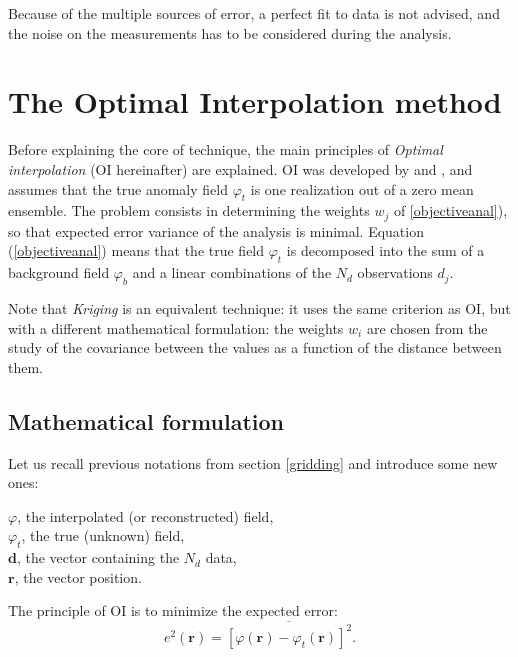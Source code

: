 Because of the multiple sources of error, a perfect fit to data is not advised, and the noise on the measurements has to be considered during the analysis.

\section{The Optimal Interpolation method\label{sec:OImethod}}
 
Before explaining the core of \diva technique, the main principles of \textit{Optimal interpolation} (OI hereinafter) are explained. OI was developed by \citet{GANDIN65} and \citet{BRETHERTON76}, and assumes that the true anomaly field $\varphi_t$ is one realization out of a zero mean ensemble. The problem consists in determining the weights $w_j$ of \eqref{objectiveanal}), so that expected error variance of the analysis is minimal. Equation (\ref{objectiveanal}) means that the true field $\varphi_t$ is decomposed into the sum of a background field $\varphi_b$ and a linear combinations of the $N_{d}$ observations $d_{j}$.

Note that \textit{Kriging} \citep{KRIGE51,MATHERON63} is an equivalent technique: it uses the same criterion as OI, but with a different mathematical formulation: the weights $w_{i}$ are chosen from the study of the covariance between the values as a function of the distance between them.

\subsection{Mathematical formulation}

Let us recall previous notations from section \ref{gridding} and introduce some new ones:

$\varphi$, the interpolated (or reconstructed) field,\\
$\varphi_{t}$, the true (unknown) field,\\
$\mathbf{d}$, the vector containing the $N_{d}$ data,\\
$\mathbf{r}$, the vector position.

The principle of OI is to minimize the expected error:
\begin{equation}
e^{2}(\mathbf{r}) = \overline{[\varphi(\mathbf{r})-\varphi_{t}(\mathbf{r})]^{2}}.
\end{equation}

